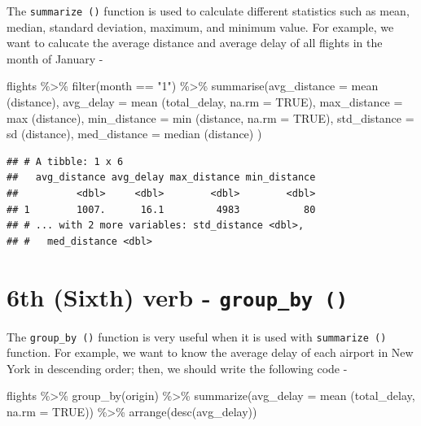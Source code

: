 \documentclass[
]{book}
\newenvironment{Shaded}{\begin{snugshade}}{\end{snugshade}}
\newcommand{\AttributeTok}[1]{\textcolor[rgb]{0.77,0.63,0.00}{#1}}
\newcommand{\ConstantTok}[1]{\textcolor[rgb]{0.00,0.00,0.00}{#1}}
\newcommand{\FunctionTok}[1]{\textcolor[rgb]{0.00,0.00,0.00}{#1}}
\newcommand{\NormalTok}[1]{#1}
\newcommand{\SpecialCharTok}[1]{\textcolor[rgb]{0.00,0.00,0.00}{#1}}
\newcommand{\StringTok}[1]{\textcolor[rgb]{0.31,0.60,0.02}{#1}}
\begin{document}
The \texttt{summarize\ ()} function is used to calculate different statistics such as mean, median, standard deviation, maximum, and minimum value. For example, we want to calucate the average distance and average delay of all flights in the month of January -

\begin{Shaded}
\begin{Highlighting}[]
\NormalTok{flights }\SpecialCharTok{\%\textgreater{}\%} 
  \FunctionTok{filter}\NormalTok{(month }\SpecialCharTok{==} \StringTok{"1"}\NormalTok{) }\SpecialCharTok{\%\textgreater{}\%} 
  \FunctionTok{summarise}\NormalTok{(}\AttributeTok{avg\_distance =} \FunctionTok{mean}\NormalTok{ (distance),}
            \AttributeTok{avg\_delay =} \FunctionTok{mean}\NormalTok{ (total\_delay, }\AttributeTok{na.rm =} \ConstantTok{TRUE}\NormalTok{),}
            \AttributeTok{max\_distance =} \FunctionTok{max}\NormalTok{ (distance),}
            \AttributeTok{min\_distance =} \FunctionTok{min}\NormalTok{ (distance, }\AttributeTok{na.rm =} \ConstantTok{TRUE}\NormalTok{),}
            \AttributeTok{std\_distance =} \FunctionTok{sd}\NormalTok{ (distance),}
            \AttributeTok{med\_distance =} \FunctionTok{median}\NormalTok{ (distance)}
\NormalTok{            )}
\end{Highlighting}
\end{Shaded}

\begin{verbatim}
## # A tibble: 1 x 6
##   avg_distance avg_delay max_distance min_distance
##          <dbl>     <dbl>        <dbl>        <dbl>
## 1        1007.      16.1         4983           80
## # ... with 2 more variables: std_distance <dbl>,
## #   med_distance <dbl>
\end{verbatim}

\hypertarget{th-sixth-verb---group_by}{%
\section{\texorpdfstring{6th (Sixth) verb - \texttt{group\_by\ ()}}{6th (Sixth) verb - group\_by ()}}\label{th-sixth-verb---group_by}}

The \texttt{group\_by\ ()} function is very useful when it is used with \texttt{summarize\ ()} function. For example, we want to know the average delay of each airport in New York in descending order; then, we should write the following code -

\begin{Shaded}
\begin{Highlighting}[]
\NormalTok{flights }\SpecialCharTok{\%\textgreater{}\%} 
  \FunctionTok{group\_by}\NormalTok{(origin) }\SpecialCharTok{\%\textgreater{}\%} 
  \FunctionTok{summarize}\NormalTok{(}\AttributeTok{avg\_delay =} \FunctionTok{mean}\NormalTok{ (total\_delay, }\AttributeTok{na.rm =} \ConstantTok{TRUE}\NormalTok{)) }\SpecialCharTok{\%\textgreater{}\%} 
  \FunctionTok{arrange}\NormalTok{(}\FunctionTok{desc}\NormalTok{(avg\_delay))}
\end{Highlighting}
\end{Shaded}
\end{document}
